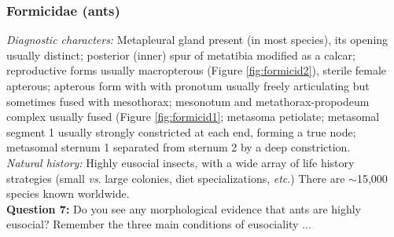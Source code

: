\documentclass[letterpaper, 11pt]{article}
\begin{document}
\subsubsection{Formicidae (ants)}
\noindent{}\textit{Diagnostic characters:} Metapleural gland present (in most species), its opening usually distinct; posterior (inner) spur of metatibia modified as a calcar; reproductive forms usually macropterous (Figure \ref{fig:formicid2}), sterile female apterous; apterous form with with pronotum usually freely articulating but sometimes fused with mesothorax; mesonotum and metathorax-propodeum complex usually fused (Figure \ref{fig:formicid1}; metasoma petiolate; metasomal segment 1 usually strongly constricted at each end, forming a true node; metasomal sternum 1 separated from sternum 2 by a deep constriction.\\

\noindent{}\textit{Natural history:} Highly eusocial insects, with a wide array of life history strategies (small \textit{vs}. large colonies, diet specializations, \textit{etc}.) There are $\sim$15,000 species known worldwide.\\

\noindent{}\textbf{Question 7:} Do you see any morphological evidence that ants are highly eusocial? Remember the three main conditions of eusociality ...\vspace{2cm}
\end{document}
